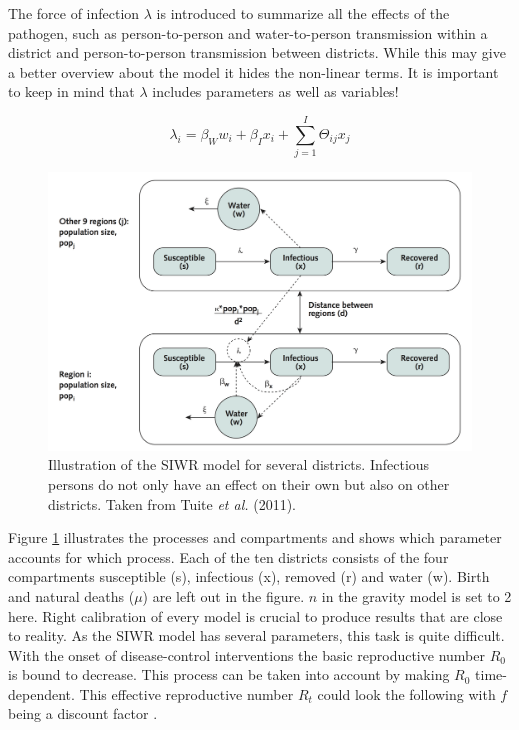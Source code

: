 \documentclass[11pt]{article}
\begin{document}
The force of infection $ \lambda $ is introduced to summarize all the effects of the pathogen, such as person-to-person and water-to-person transmission within a district and person-to-person transmission between districts. While this may give a better overview about the model it hides the non-linear terms. It is important to keep in mind that $ \lambda $ includes parameters as well as variables! 

\begin{center}
\begin{minipage}[t]{0.5\textwidth}

\begin{equation}

\lambda_{i}=\beta_{W}w_{i}+\beta_{I}x_{i}+\sum\limits_{j=1}^I  \Theta_{ij}  x_{j}

\end{equation}
\end{minipage}
\end{center}
\newline



\begin{center}
\begin{figure}
\includegraphics[scale=.9]{Bilder/figure_model_haiti.png}
\caption{Illustration of the SIWR model for several districts. Infectious persons do not only have an effect on their own but also on other districts. Taken from Tuite \textit{et al.} (2011).}
\label{pic:model_departments}
\end{figure}
\end{center}


Figure \ref{pic:model_departments} illustrates the processes and compartments and shows which parameter accounts for which process. Each of the ten districts consists of the four compartments susceptible (s), infectious (x), removed (r) and water (w). Birth and natural deaths ($ \mu $) are left out in the figure. $ n $ in the gravity model is set to 2 here. Right calibration of every model is crucial to produce results that are close to reality. As the SIWR model has several parameters, this task is quite difficult. With the onset of disease-control interventions the basic reproductive number $ R_{0} $ is bound to decrease. This process can be taken into account by making $ R_{0} $ time-dependent. This effective reproductive number $ R_{t} $ could look the following with $ f $ being a discount factor \cite{tuite:2011}.
\end{document}
